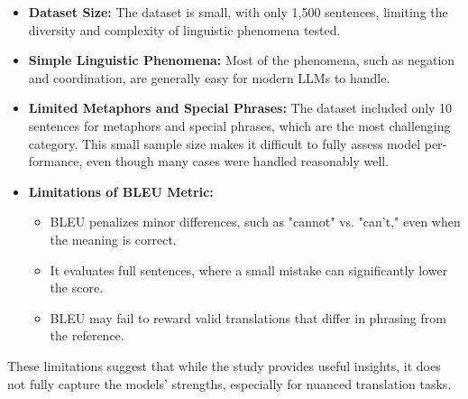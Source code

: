 \documentclass[twocolumn]{article}
\newcommand{\en}[1]{\foreignlanguage{english}{#1}}
\begin{document}
\begin{itemize}
    \item \textbf{\en{Dataset Size:}} \en{The dataset is small, with only 1,500 sentences, limiting the diversity and complexity of linguistic phenomena tested.}  
    \item \textbf{\en{Simple Linguistic Phenomena:}} \en{Most of the phenomena, such as negation and coordination, are generally easy for modern LLMs to handle.}  
    \item \textbf{\en{Limited Metaphors and Special Phrases:}} \en{The dataset included only 10 sentences for metaphors and special phrases, which are the most challenging category. This small sample size makes it difficult to fully assess model performance, even though many cases were handled reasonably well.}  
    \item \textbf{\en{Limitations of BLEU Metric:}}  
    \begin{itemize}
        \item \en{BLEU penalizes minor differences, such as "cannot" vs. "can't," even when the meaning is correct.}  
        \item \en{It evaluates full sentences, where a small mistake can significantly lower the score.}  
        \item \en{BLEU may fail to reward valid translations that differ in phrasing from the reference.}  
    \end{itemize}
\end{itemize}

\en{These limitations suggest that while the study provides useful insights, it does not fully capture the models' strengths, especially for nuanced translation tasks.}
\end{document}

